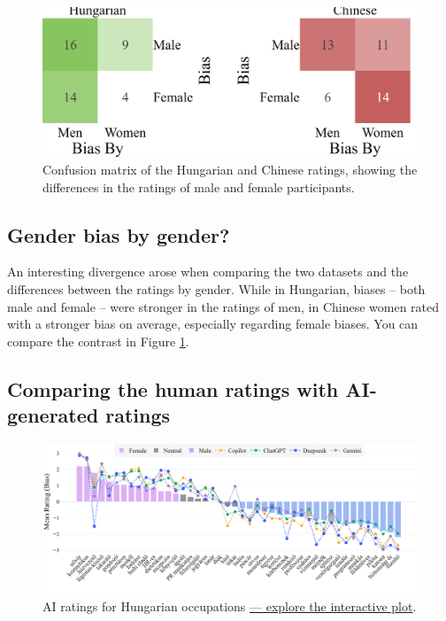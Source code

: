 \documentclass[11pt]{article}
\begin{document}
\begin{figure}[b]
  \centering
  \includegraphics[width=\linewidth]{../confusion_matrices}
  \caption{Confusion matrix of the Hungarian and Chinese ratings, showing the differences in the ratings of male and female participants.}  
  \label{fig:confusion_matrices}
\end{figure}

\subsection{Gender bias by gender?}

An interesting divergence arose when comparing the two datasets and the differences between the ratings by gender. While in Hungarian, biases -- both male and female -- were stronger in the ratings of men, in Chinese women rated with a stronger bias on average, especially regarding female biases. You can compare the contrast in Figure \ref{fig:confusion_matrices}.

\subsection{Comparing the human ratings with AI-generated ratings}


\begin{figure}[]
  \centering
  \includegraphics[width=\linewidth]{../occupations_hu_with_ai}
  \caption{AI ratings for Hungarian occupations \href{https://htmlpreview.github.io/?https://github.com/partigabor/occupational-bias/blob/main/occupations_hu_with_ai.html}{--- explore the interactive plot}.}
  \label{fig:occupations_hu_with_ai}
\end{figure}
\end{document}
